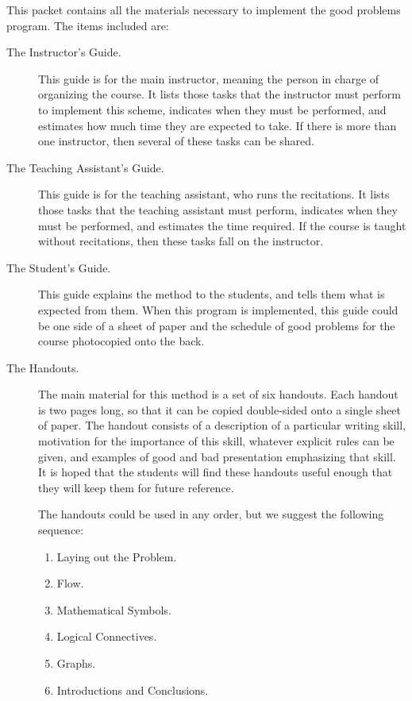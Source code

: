 %
%
%
%
%
%
%


This packet contains all the materials necessary to implement the good
problems program. The items included are:
\begin{description}
	\item[The Instructor's Guide.] This guide is for the main
instructor, meaning the person in charge of organizing the course. It lists
those tasks that the 
instructor must perform to implement this scheme, indicates when they must be
performed, and estimates how much time they are expected to take.
If there is more than one instructor, then several of these tasks can be
shared. 
	\item[The Teaching Assistant's Guide.]
This guide is for the teaching assistant, who runs the recitations.
It lists those tasks that the teaching assistant must perform, indicates
when they must be performed, and estimates the time required.
If the course is taught without recitations, then these tasks
fall on the instructor.
	\item[The Student's Guide.] This guide explains the method to the
students, and tells them what is expected from them.
When this program is implemented, this guide could be one side of a sheet
of paper and the schedule of good problems for the course photocopied onto
the back. 
	\item[The Handouts.] The main material for this method is a set of
six handouts. 
Each handout is two pages long, so that it can be copied double-sided onto
a single sheet of paper. 
The handout consists of a description of a particular writing skill,
motivation for the importance of this skill,
whatever explicit rules can be given,
and examples of good and bad presentation emphasizing that skill.
 It is hoped that
the students will find these handouts useful enough that they will keep
them for future reference.

The handouts could be used in any order, but we suggest the following sequence:
\begin{enumerate}
\item Laying out the Problem.
\item Flow.
\item Mathematical Symbols.
\item Logical Connectives.
\item Graphs.
\item Introductions and Conclusions.
\end{enumerate}

\end{description}

